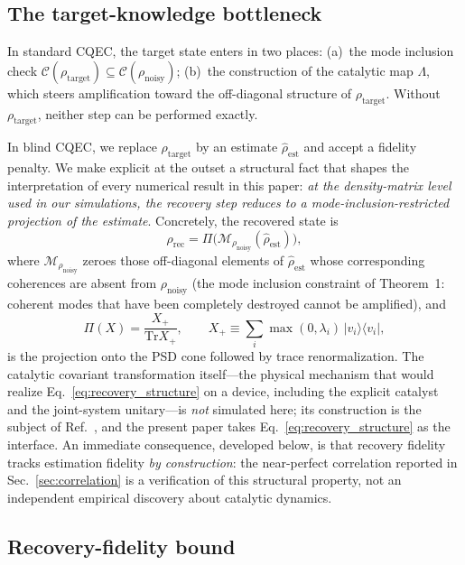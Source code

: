 \documentclass[a4paper,onecolumn]{quantumarticle}
\newcommand{\CC}{\mathcal{C}}
\newcommand{\tr}{\mathrm{Tr}}
\newcommand{\rhot}{\rho_\mathrm{target}}
\newcommand{\rhon}{\rho_\mathrm{noisy}}
\newcommand{\rhor}{\rho_\mathrm{rec}}
\newcommand{\rhoe}{\hat{\rho}_\mathrm{est}}
\begin{document}
\subsection{The target-knowledge bottleneck}
\label{sec:bottleneck}

In standard CQEC, the target state enters in two places:
(a)~the mode inclusion check $\CC(\rhot) \subseteq \CC(\rhon)$;
(b)~the construction of the catalytic map $\Lambda$, which steers amplification toward the off-diagonal structure of $\rhot$.
Without $\rhot$, neither step can be performed exactly.

In blind CQEC, we replace $\rhot$ by an estimate $\rhoe$ and accept a fidelity penalty.
We make explicit at the outset a structural fact that shapes the interpretation of every numerical result in this paper: \emph{at the density-matrix level used in our simulations, the recovery step reduces to a mode-inclusion-restricted projection of the estimate}.
Concretely, the recovered state is
\begin{equation}
\rhor = \Pi\bigl(\mathcal{M}_{\rhon}(\rhoe)\bigr),
\label{eq:recovery_structure}
\end{equation}
where $\mathcal{M}_{\rhon}$ zeroes those off-diagonal elements of $\rhoe$ whose corresponding coherences are absent from $\rhon$ (the mode inclusion constraint of Theorem~1: coherent modes that have been completely destroyed cannot be amplified), and
\begin{equation}
\Pi(X) = \frac{X_+}{\tr X_+},\qquad X_+ \equiv \sum_i \max(0,\lambda_i)\,|v_i\rangle\!\langle v_i|,
\label{eq:psd_proj}
\end{equation}
is the projection onto the PSD cone followed by trace renormalization.
The catalytic covariant transformation itself---the physical mechanism that would realize Eq.~\eqref{eq:recovery_structure} on a device, including the explicit catalyst and the joint-system unitary---is \emph{not} simulated here; its construction is the subject of Ref.~\cite{Wakaura2026unified}, and the present paper takes Eq.~\eqref{eq:recovery_structure} as the interface.
An immediate consequence, developed below, is that recovery fidelity tracks estimation fidelity \emph{by construction}: the near-perfect correlation reported in Sec.~\ref{sec:correlation} is a verification of this structural property, not an independent empirical discovery about catalytic dynamics.

\subsection{Recovery-fidelity bound}
\label{sec:lipschitz_proof}
\end{document}
